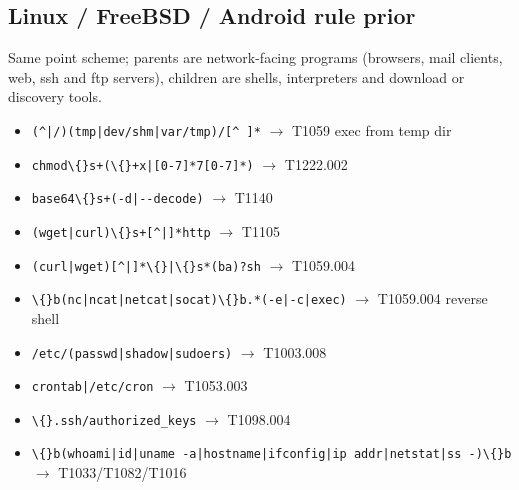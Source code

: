 \subsection{Linux / FreeBSD / Android rule prior}
Same point scheme; parents are network-facing programs (browsers, mail clients, web, ssh and ftp servers), children
are shells, interpreters and download or discovery tools.
\begin{itemize}\footnotesize
\item \texttt{(\allowbreak{}\^{}|\allowbreak{}/\allowbreak{})\allowbreak{}(\allowbreak{}tmp|\allowbreak{}dev/\allowbreak{}shm|\allowbreak{}var/\allowbreak{}tmp)\allowbreak{}/\allowbreak{}[\^{} ]*\allowbreak{}} $\rightarrow$ T1059 exec from temp dir
\item \texttt{chmod\textbackslash\{\}s+\allowbreak{}(\allowbreak{}\textbackslash\{\}+\allowbreak{}x|\allowbreak{}[0-\allowbreak{}7]*\allowbreak{}7[0-\allowbreak{}7]*\allowbreak{})\allowbreak{}} $\rightarrow$ T1222.\allowbreak{}002
\item \texttt{base64\textbackslash\{\}s+\allowbreak{}(\allowbreak{}-\allowbreak{}d|\allowbreak{}-\allowbreak{}-\allowbreak{}decode)\allowbreak{}} $\rightarrow$ T1140
\item \texttt{(\allowbreak{}wget|\allowbreak{}curl)\allowbreak{}\textbackslash\{\}s+\allowbreak{}[\^{}|\allowbreak{}]*\allowbreak{}http} $\rightarrow$ T1105
\item \texttt{(\allowbreak{}curl|\allowbreak{}wget)\allowbreak{}[\^{}|\allowbreak{}]*\allowbreak{}\textbackslash\{\}|\allowbreak{}\textbackslash\{\}s*\allowbreak{}(\allowbreak{}ba)\allowbreak{}?\allowbreak{}sh} $\rightarrow$ T1059.\allowbreak{}004
\item \texttt{\textbackslash\{\}b(\allowbreak{}nc|\allowbreak{}ncat|\allowbreak{}netcat|\allowbreak{}socat)\allowbreak{}\textbackslash\{\}b.\allowbreak{}*\allowbreak{}(\allowbreak{}-\allowbreak{}e|\allowbreak{}-\allowbreak{}c|\allowbreak{}exec)\allowbreak{}} $\rightarrow$ T1059.\allowbreak{}004 reverse shell
\item \texttt{/\allowbreak{}etc/\allowbreak{}(\allowbreak{}passwd|\allowbreak{}shadow|\allowbreak{}sudoers)\allowbreak{}} $\rightarrow$ T1003.\allowbreak{}008
\item \texttt{crontab|\allowbreak{}/\allowbreak{}etc/\allowbreak{}cron} $\rightarrow$ T1053.\allowbreak{}003
\item \texttt{\textbackslash\{\}.\allowbreak{}ssh/\allowbreak{}authorized\_keys} $\rightarrow$ T1098.\allowbreak{}004
\item \texttt{\textbackslash\{\}b(\allowbreak{}whoami|\allowbreak{}id|\allowbreak{}uname -\allowbreak{}a|\allowbreak{}hostname|\allowbreak{}ifconfig|\allowbreak{}ip addr|\allowbreak{}netstat|\allowbreak{}ss -\allowbreak{})\allowbreak{}\textbackslash\{\}b} $\rightarrow$ T1033/\allowbreak{}T1082/\allowbreak{}T1016

\end{itemize}
